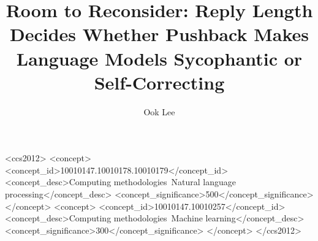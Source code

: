 \documentclass[acmsmall,anonymous]{acmart}
\begin{document}
\title[Room to Reconsider]{Room to Reconsider: Reply Length Decides Whether Pushback Makes Language Models Sycophantic or Self-Correcting}

\author{Ook Lee}

\begin{abstract}

\end{abstract}

\begin{CCSXML}
<ccs2012>
   <concept>
       <concept_id>10010147.10010178.10010179</concept_id>
       <concept_desc>Computing methodologies~Natural language processing</concept_desc>
       <concept_significance>500</concept_significance>
   </concept>
   <concept>
       <concept_id>10010147.10010257</concept_id>
       <concept_desc>Computing methodologies~Machine learning</concept_desc>
       <concept_significance>300</concept_significance>
   </concept>
</ccs2012>
\end{CCSXML}



\maketitle



\FloatBarrier



\appendix

\end{document}
